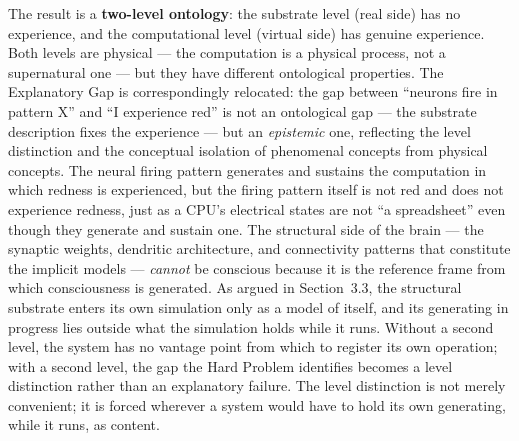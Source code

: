 \documentclass[12pt]{article}
\begin{document}
The result is a \textbf{two-level ontology}: the substrate level (real side) has no experience, and the computational level (virtual side) has genuine experience. Both levels are physical --- the computation is a physical process, not a supernatural one --- but they have different ontological properties. The Explanatory Gap is correspondingly relocated: the gap between ``neurons fire in pattern X'' and ``I experience red'' is not an ontological gap --- the substrate description fixes the experience --- but an \emph{epistemic} one, reflecting the level distinction and the conceptual isolation of phenomenal concepts from physical concepts. The neural firing pattern generates and sustains the computation in which redness is experienced, but the firing pattern itself is not red and does not experience redness, just as a CPU's electrical states are not ``a spreadsheet'' even though they generate and sustain one. The structural side of the brain --- the synaptic weights, dendritic architecture, and connectivity patterns that constitute the implicit models --- \emph{cannot} be conscious because it is the reference frame from which consciousness is generated. As argued in Section~3.3, the structural substrate enters its own simulation only as a model of itself, and its generating in progress lies outside what the simulation holds while it runs. Without a second level, the system has no vantage point from which to register its own operation; with a second level, the gap the Hard Problem identifies becomes a level distinction rather than an explanatory failure. The level distinction is not merely convenient; it is forced wherever a system would have to hold its own generating, while it runs, as content.
\end{document}
